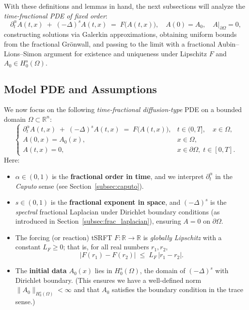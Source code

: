 \documentclass[12pt]{article}
\begin{document}
With these definitions and lemmas in hand, the next subsections will analyze the 
\emph{time-fractional PDE of fixed order}:
\[
\partial_t^\alpha A(t,x)
\;+\;
(-\Delta)^s A(t,x)
\;=\;
F\bigl(A(t,x)\bigr),
\quad
A(0)=A_0,\quad
A\big|_{\partial\Omega}=0,
\]
constructing solutions via Galerkin approximations, obtaining uniform bounds from the 
fractional Gr\"onwall, and passing to the limit with a fractional Aubin--Lions--Simon 
argument for existence and uniqueness under Lipschitz $F$ and $A_0\in H_0^s(\Omega)$.




\subsection{Model PDE and Assumptions}
\label{subsec:base_pde_expanded}

We now focus on the following \emph{time-fractional diffusion-type} PDE on a bounded domain
\(\Omega\subset\mathbb{R}^n\):
\begin{equation}
\label{eq:fixedOrderPDE}
\begin{cases}
\displaystyle
\partial_t^\alpha A(t,x) 
\;+\; 
(-\Delta)^s A(t,x)
\;=\;
F\bigl(A(t,x)\bigr),
& t\in (0,T], \quad x\in \Omega,
\\[6pt]
A(0,x) = A_0(x), 
& x\in \Omega,
\\[4pt]
A(t,x) = 0,
& x\in \partial\Omega,\; t\in[0,T].
\end{cases}
\end{equation}
Here:
\begin{itemize}
\item \(\alpha\in(0,1)\) is the \textbf{fractional order in time}, and we interpret
  \(\partial_t^\alpha\) in the \emph{Caputo} sense (see
  Section~\ref{subsec:caputo}).
\item \(s\in(0,1)\) is the \textbf{fractional exponent in space}, and \((-\Delta)^s\)
  is the \emph{spectral} fractional Laplacian under Dirichlet boundary conditions
  (as introduced in Section~\ref{subsec:frac_laplacian}), ensuring \(A=0\) on
  \(\partial\Omega\).
\item The forcing (or reaction) tSRFT \(F:\mathbb{R}\to\mathbb{R}\) is \emph{globally
  Lipschitz} with a constant \(L_F\ge0\); that is, for all real numbers \(r_1,r_2\),
  \[
    \lvert F(r_1) - F(r_2)\rvert
    \;\le\; L_F\,\lvert r_1 - r_2\rvert.
  \]
\item The \textbf{initial data} \(A_0(x)\) lies in \(H_0^s(\Omega)\), the domain of
  \((-\Delta)^s\) with Dirichlet boundary. (This ensures we have a well-defined norm
  \(\|A_0\|_{H_0^s(\Omega)}<\infty\) and that \(A_0\) satisfies the boundary condition
  in the trace sense.)
\end{itemize}
\end{document}
